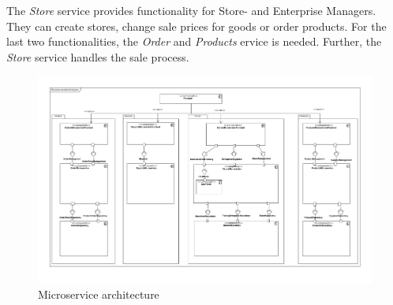	The \textit{Store} service provides functionality for Store- and Enterprise Managers. 
	They can create stores, change sale prices for goods or order products. 
	For the last two functionalities, the \textit{Order} and \textit{Products} ervice is needed. 
	Further, the \textit{Store} service handles the sale process. 
	


	
	
	\begin{figure}
	   	\includegraphics[width=\textwidth]{img/MicroserviceArchitecture.pdf}
	   	\caption{Microservice architecture}
	   	\label{MS_ARch}
	\end{figure}
